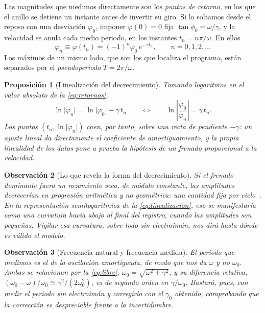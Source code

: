 \documentclass[a4paper,11pt]{amsart}
\numberwithin{equation}{section}
\newcommand{\wz}{\omega_0}                    %
\newcommand{\wa}{\omega}                      %
\theoremstyle{cienplano}
\newtheorem{proposicion}{Proposición}[section]
\theoremstyle{ciendef}
\theoremstyle{cienobs}
\newtheorem{observacion}[proposicion]{Observación}
\begin{document}
Las magnitudes que medimos directamente son los \emph{puntos de retorno}, en
los que el anillo se detiene un instante antes de invertir su giro. Si lo
soltamos desde el reposo con una desviación $\varphi_0$, imponer
$\dot\varphi(0)=0$ fija $\tan\phi_0=\wa/\gamma$, y la velocidad se anula cada
medio periodo, en los instantes $t_n=n\pi/\wa$. En ellos
\begin{equation}\label{eq:retornos}
  \varphi_n\equiv\varphi(t_n)=(-1)^{n}\varphi_0\,e^{-\gamma t_n},\qquad n=0,1,2,\dots
\end{equation}
Los máximos de un mismo lado, que son los que localiza el programa, están
separados por el \emph{pseudoperiodo} $T=2\pi/\wa$.

\begin{proposicion}[Linealización del decrecimiento]\label{prop:linealizacion}
Tomando logaritmos en el valor absoluto de la \cref{eq:retornos},
\begin{equation}\label{eq:linealizacion}
  \ln\lvert\varphi_n\rvert=\ln\lvert\varphi_0\rvert-\gamma\,t_n
  \qquad\Longleftrightarrow\qquad
  \ln\left\lvert\frac{\varphi_0}{\varphi_n}\right\rvert=\gamma\,t_n .
\end{equation}
Los puntos $(t_n,\ln\lvert\varphi_n\rvert)$ caen, por tanto, sobre una recta
de pendiente $-\gamma$: un ajuste lineal da directamente el coeficiente de
amortiguamiento, y la propia linealidad de los datos pone a prueba la hipótesis
de un frenado proporcional a la velocidad.
\end{proposicion}

\begin{observacion}[Lo que revela la forma del decrecimiento]\label{obs:coulomb}
Si el frenado dominante fuera un rozamiento seco, de módulo constante, las
amplitudes decrecerían en progresión \emph{aritmética} y no geométrica: una
cantidad fija por ciclo~\cite{TAYLOR-CM}. En la representación
semilogarítmica de la \cref{eq:linealizacion}, eso se manifestaría como una
curvatura hacia abajo al final del registro, cuando las amplitudes son
pequeñas. Vigilar esa curvatura, sobre todo sin electroimán, nos dirá hasta
dónde es válido el modelo.
\end{observacion}

\begin{observacion}[Frecuencia natural y frecuencia medida]\label{obs:w0}
El periodo que medimos es el de la oscilación amortiguada, de modo que nos da
$\wa$ y no $\wz$. Ambas se relacionan por la \cref{eq:libre},
$\wz=\sqrt{\wa^{2}+\gamma^{2}}$, y su diferencia relativa,
$(\wz-\wa)/\wz\simeq\gamma^{2}/(2\wz^{2})$, es de segundo orden en
$\gamma/\wz$. Bastará, pues, con medir el periodo sin electroimán y corregirlo
con el $\gamma_0$ obtenido, comprobando que la corrección es despreciable
frente a la incertidumbre.
\end{observacion}
\end{document}
